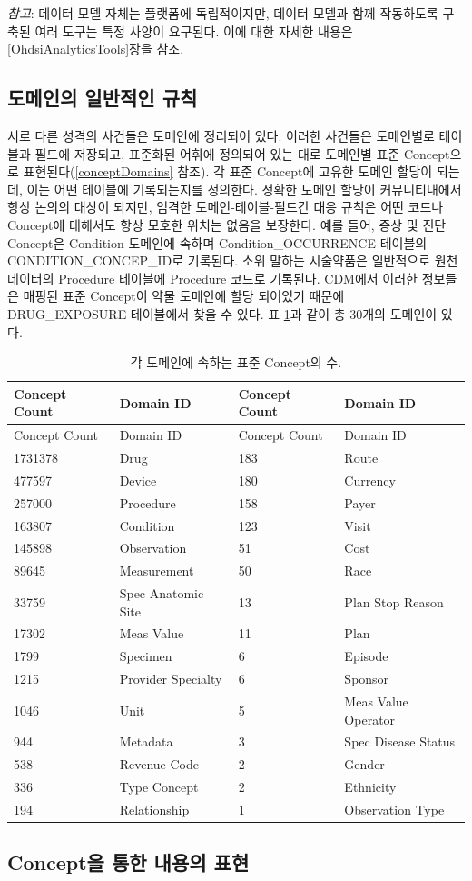 \documentclass[11pt]{book}
\theoremstyle{definition}
\theoremstyle{definition}
\theoremstyle{definition}
\theoremstyle{remark}
\begin{document}
\emph{참고}: 데이터 모델 자체는 플랫폼에 독립적이지만, 데이터 모델과
함께 작동하도록 구축된 여러 도구는 특정 사양이 요구된다. 이에 대한
자세한 내용은 \ref{OhdsiAnalyticsTools}장을 참조.

\subsection{도메인의 일반적인 규칙}\label{domains}

서로 다른 성격의 사건들은 도메인에 정리되어 있다. 이러한 사건들은
도메인별로 테이블과 필드에 저장되고, 표준화된 어휘에 정의되어 있는 대로
도메인별 표준 Concept으로 표현된다(\ref{conceptDomains} 참조). 각 표준
Concept에 고유한 도메인 할당이 되는데, 이는 어떤 테이블에 기록되는지를
정의한다. 정확한 도메인 할당이 커뮤니티내에서 항상 논의의 대상이 되지만,
엄격한 도메인-테이블-필드간 대응 규칙은 어떤 코드나 Concept에 대해서도
항상 모호한 위치는 없음을 보장한다. 예를 들어, 증상 및 진단 Concept은
Condition 도메인에 속하며 Condition\_OCCURRENCE
테이블의CONDITION\_CONCEP\_ID로 기록된다. 소위 말하는 시술약품은
일반적으로 원천 데이터의 Procedure 테이블에 Procedure 코드로 기록된다.
CDM에서 이러한 정보들은 매핑된 표준 Concept이 약물 도메인에 할당
되어있기 때문에 DRUG\_EXPOSURE 테이블에서 찾을 수 있다. 표
\ref{tab:domains}과 같이 총 30개의 도메인이 있다.

\begin{longtable}[]{@{}llll@{}}
\caption{\label{tab:domains} 각 도메인에 속하는 표준 Concept의
수.}\tabularnewline
\toprule
Concept Count & Domain ID & Concept Count & Domain ID\tabularnewline
\midrule
\endfirsthead
\toprule
Concept Count & Domain ID & Concept Count & Domain ID\tabularnewline
\midrule
\endhead
1731378 & Drug & 183 & Route\tabularnewline
477597 & Device & 180 & Currency\tabularnewline
257000 & Procedure & 158 & Payer\tabularnewline
163807 & Condition & 123 & Visit\tabularnewline
145898 & Observation & 51 & Cost\tabularnewline
89645 & Measurement & 50 & Race\tabularnewline
33759 & Spec Anatomic Site & 13 & Plan Stop Reason\tabularnewline
17302 & Meas Value & 11 & Plan\tabularnewline
1799 & Specimen & 6 & Episode\tabularnewline
1215 & Provider Specialty & 6 & Sponsor\tabularnewline
1046 & Unit & 5 & Meas Value Operator\tabularnewline
944 & Metadata & 3 & Spec Disease Status\tabularnewline
538 & Revenue Code & 2 & Gender\tabularnewline
336 & Type Concept & 2 & Ethnicity\tabularnewline
194 & Relationship & 1 & Observation Type\tabularnewline
\bottomrule
\end{longtable}

\subsection{Concept을 통한 내용의 표현}\label{concept---}
\end{document}

